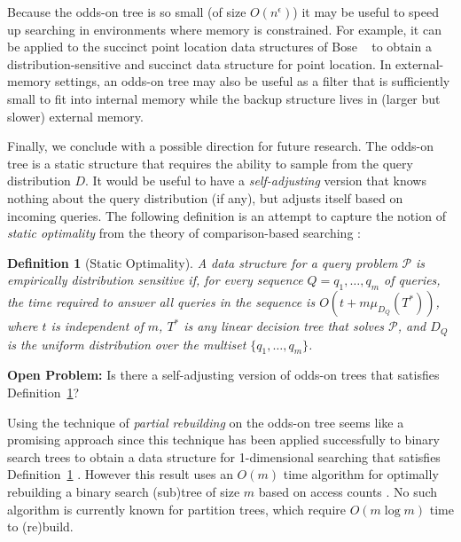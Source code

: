 \documentclass{patmorin}
\newtheorem{defn}{Definition}
\newcommand{\defref}[1]{Definition~\ref{defn:#1}}
\begin{document}
Because the odds-on tree is so small (of size $O(n^\epsilon)$) it
may be useful to speed up searching in environments where memory is
constrained. For example, it can be applied to the succinct point
location data structures of Bose \etal\ \cite{bchmm09} to obtain a
distribution-sensitive and succinct data structure for point location.
In external-memory settings, an odds-on tree may also be useful as a filter
that is sufficiently small to fit into internal memory while the backup
structure lives in (larger but slower) external memory.

Finally, we conclude with a possible direction for future research.  The
odds-on tree is a static structure that requires the ability to sample from
the query distribution $D$.  It would be useful to have a \emph{self-adjusting}
version that knows nothing about the query distribution (if any), but
adjusts itself based on incoming queries.   The following definition
is an attempt to capture the notion of \emph{static optimality} from the theory
of comparison-based searching \cite{st85}:

\begin{defn}[Static Optimality]\label{defn:static-optimality}
A data structure for a query problem $\mathcal{P}$ is \emph{empirically
distribution sensitive} if, for every sequence $Q=q_1,\ldots,q_m$
of queries, the time required to answer all queries in the sequence
is $O(t + m\mu_{D_Q}(T^*))$, where $t$ is independent of $m$, $T^*$
is any linear decision tree that solves $\mathcal{P}$, and $D_{Q}$
is the uniform distribution over the multiset $\{q_1,\ldots,q_m\}$.
\end{defn}

\noindent\textbf{Open Problem:} Is there a self-adjusting version of
odds-on trees that satisfies \defref{static-optimality}?

Using the technique of \emph{partial rebuilding} \cite{o83} on the odds-on
tree seems like a promising approach since this technique has been
applied successfully to binary search trees to obtain a data structure
for 1-dimensional searching that satisfies \defref{static-optimality}
\cite{g00}.  However this result uses an $O(m)$ time algorithm for
optimally rebuilding a binary search (sub)tree of size $m$ based on
access counts \cite{m77}.  No such algorithm is currently known for
partition trees, which require $O(m\log m)$ time to (re)build.




\end{document}
